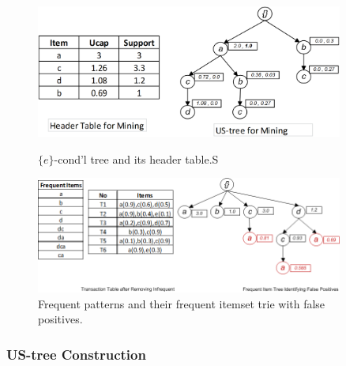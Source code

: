 \documentclass[10pt, conference, compsocconf]{IEEEtran}
\begin{document}
\begin{figure}[t]
    \begin{minipage}{0.45\linewidth}
	\centering
	\includegraphics[width=0.9\textwidth]{visio/M_TREE}  
		\vspace*{-3mm}
	\caption{$\{e\}$-cond'l tree and its header table.S}
	\label{figure:E_COND_TREE_HEADER_TABLE}
    \end{minipage}%
    \begin{minipage}{0.55\linewidth}
    \centering
	\includegraphics[width=0.9\textwidth]{visio/frequent_tree_final_ex}  
		\vspace*{-3mm}
	\caption{Frequent patterns and their frequent itemset trie with false positives.}
	\label{figure:FALSE_NEGATIVE}
    \end{minipage}
\end{figure}

\subsubsection{US-tree Construction}
\end{document}
